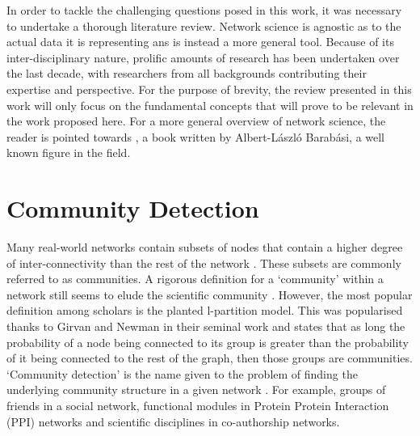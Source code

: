 \documentclass{report}
\begin{document}
	In order to tackle the challenging questions posed in this work, it was necessary to undertake a thorough literature review. Network science is agnostic as to the actual data it is representing ans is instead a more general tool. Because of its inter-disciplinary nature, prolific amounts of research has been undertaken over the last decade, with researchers from all backgrounds contributing their expertise and perspective. For the purpose of brevity, the review presented in this work will only focus on the fundamental concepts that will prove to be relevant in the work proposed here. For a more general overview of network science, the reader is pointed towards \cite{barabasi2002linked}, a book written by Albert-L{\'a}szl{\'o} Barab{\'a}si, a well known figure in the field.
	
	\section{Community Detection}
	
	Many real-world networks contain subsets of nodes that contain a higher degree of inter-connectivity than the rest of the network
	\cite{girvan2002community,palla2005uncovering,lancichinetti2009detecting}.
	These subsets are commonly referred to as communities. 
	A rigorous definition for a `community' within a network still seems to elude the scientific community \cite{lancichinetti2009detecting}.
	However, the most popular definition among scholars is the planted l-partition model.
	This was popularised thanks to Girvan and Newman in their seminal work \cite{girvan2002community} and states that as long the probability of a node being connected to its group is greater than the probability of it being connected to the rest of the graph, then those groups are communities. 
	`Community detection' is the name given to the problem of finding the underlying community structure in a given network \cite{girvan2002community}. 
	For example, groups of friends in a social network, functional modules in Protein Protein Interaction (PPI) networks and scientific disciplines in co-authorship networks.
	
\end{document}
